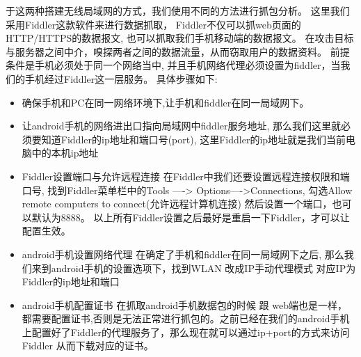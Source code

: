 于这两种搭建无线局域网的方式，我们使用不同的方法进行抓包分析。
这里我们采用Fiddler\cite{crane2015fiddler}这款软件来进行数据抓取， Fiddler不仅可以抓web页面的HTTP/HTTPS的数据报文, 也可以抓取我们手机移动端的数据报文。
在攻击目标与服务器之间中介，嗅探两者之间的数据流量，从而窃取用户的数据资料。
前提条件是手机必须处于同一个网络当中, 并且手机网络代理必须设置为fiddler，当我们的手机经过Fiddler这一层服务。
具体步骤如下:
\begin{itemize}
    \item 确保手机和PC在同一网络环境下,让手机和fiddler在同一局域网下。
    \item 让android手机的网络进出口指向局域网中fiddler服务地址, 那么我们这里就必须要知道Fiddler的ip地址和端口号(port), 这里Fiddler的ip地址就是我们当前电脑中的本机ip地址
    \item Fiddler设置端口与允许远程连接 在Fiddler中我们还要设置远程连接权限和端口号, 找到Fiddler菜单栏中的Tools ----> Options---->Connections, 勾选Allow remote computers to connect(允许远程计算机连接) 然后设置一个端口，也可以默认为8888。 以上所有Fiddler设置之后最好是重启一下Fiddler，才可以让配置生效。
    \item android手机设置网络代理 在确定了手机和fiddler在同一局域网下之后, 那么我们来到android手机的设置选项下，找到WLAN 改成IP手动代理模式 对应IP为Fiddler的ip地址和端口
    \item android手机配置证书 在抓取android手机数据包的时候 跟 web端也是一样，都需要配置证书,否则是无法正常进行抓包的。之前已经在我们的android手机上配置好了Fiddler的代理服务了，那么现在就可以通过ip+port的方式来访问Fiddler 从而下载对应的证书。
\end{itemize}

